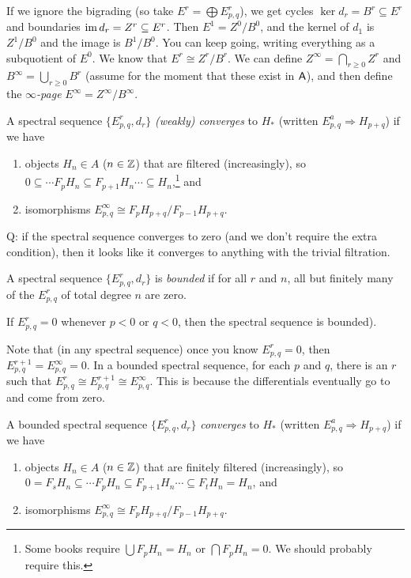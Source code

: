If we ignore the bigrading (so take $E^r=\bigoplus E^r_{p,q}$), we get cycles $\ker d_r=B^r\subseteq E^r$ and boundaries $\operatorname{im} d_r=Z^r\subseteq E^r$. Then $E^1= Z^0/B^0$, and the kernel of $d_1$ is $Z^1/B^0$ and the image is $B^1/B^0$. You can keep going, writing everything as a subquotient of $E^0$. We know that $E^r\cong Z^r/B^r$. We can define $Z^\infty = \bigcap_{r\ge 0} Z^r$ and $B^\infty = \bigcup_{r\ge 0} B^r$ (assume for the moment that these exist in $\text{\sf A}$), and then define the \emph{$\infty$-page} $E^\infty = Z^\infty/B^\infty$.
\begin{definition}
 A spectral sequence $\{E^r_{p,q},d_r\}$ \emph{(weakly) converges} to $H_*$ (written $E^a_{p,q}\Rightarrow H_{p+q}$) if we have
 \begin{enumerate}
  \item objects $H_n\in A$ ($n\in \mathbb{Z}$) that are filtered (increasingly), so $0\subseteq \cdots F_pH_n \subseteq F_{p+1}H_n\cdots \subseteq H_n$,\footnote{Some books require $\bigcup F_p H_n=H_n$ or $\bigcap F_pH_n=0$. We should probably require this.} and
  \item isomorphisms $E^\infty_{p,q}\cong F_pH_{p+q}/F_{p-1}H_{p+q}$.\qedhere
 \end{enumerate}
\end{definition}
Q: if the spectral sequence converges to zero (and we don't require the extra condition), then it looks like it converges to anything with the trivial filtration.
\begin{definition}
 A spectral sequence $\{E^r_{p,q},d_r\}$ is \emph{bounded} if for all $r$ and $n$, all but finitely many of the $E^r_{p,q}$ of total degree $n$ are zero.
\end{definition}
\begin{example}
 If $E^r_{p,q}=0$ whenever $p<0$ or $q<0$, then the spectral sequence is bounded).
\end{example}
Note that (in any spectral sequence) once you know $E^r_{p,q}=0$, then $E^{r+1}_{p,q}=E^\infty_{p,q}=0$. In a bounded spectral sequence, for each $p$ and $q$, there is an $r$ such that $E^r_{p,q}\cong E^{r+1}_{p,q}\cong E^\infty_{p,q}$. This is because the differentials eventually go to and come from zero.
\begin{definition}
 A bounded spectral sequence $\{E^r_{p,q},d_r\}$ \emph{converges} to $H_*$ (written $E^a_{p,q}\Rightarrow H_{p+q}$) if we have
 \begin{enumerate}
  \item objects $H_n\in A$ ($n\in \mathbb{Z}$) that are finitely filtered (increasingly), so $0=F_sH_n\subseteq \cdots F_pH_n \subseteq F_{p+1}H_n\cdots \subseteq F_t H_n= H_n$, and
  \item isomorphisms $E^\infty_{p,q}\cong F_pH_{p+q}/F_{p-1}H_{p+q}$.\qedhere
 \end{enumerate}
\end{definition}
